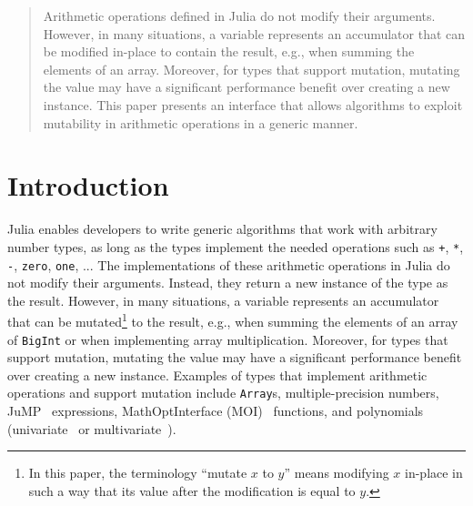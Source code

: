 \documentclass{juliacon}
\begin{document}


\maketitle

\begin{abstract}

Arithmetic operations defined in Julia do not modify their arguments.
However, in many situations, a variable represents an accumulator that can be modified in-place to contain the result, e.g., when summing the elements of an array.
Moreover, for types that support mutation, mutating the value may have a significant performance benefit over creating a new instance.
This paper presents an interface that allows algorithms to exploit mutability in arithmetic operations in a generic manner.

\end{abstract}

\section{Introduction}

Julia enables developers to write generic algorithms that work with arbitrary number types, as long as the types implement the needed operations
such as \lstinline|+|, \lstinline|*|, \lstinline|-|, \lstinline|zero|, \lstinline|one|, ...
The implementations of these arithmetic operations in Julia do not modify their arguments. Instead, they return a new instance of the type as the result.
However, in many situations, a variable represents an accumulator that can be mutated\footnote{\label{foot:mutate}In this paper, the terminology ``mutate $x$ to $y$'' means modifying $x$ in-place in such a way that its value after the modification is equal to $y$.} to the result, e.g.,
when summing the elements of an array of \lstinline|BigInt| or when implementing array multiplication.
Moreover, for types that support mutation, mutating the value may have a significant performance benefit over creating a new instance.
Examples of types that implement arithmetic operations and support mutation include \lstinline|Array|s, multiple-precision numbers, JuMP~\cite{dunning2017jump} expressions, MathOptInterface (MOI)~\cite{legat2021mathoptinterface} functions, and polynomials (univariate~\cite{verzani2021polynomials} or multivariate~\cite{legat2023multivariate}).
\end{document}
